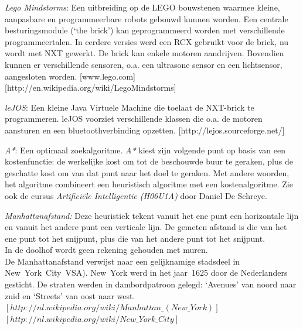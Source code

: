 \documentclass[tt1]{penoverslag}
\begin{document}
\newpage



\begin{thebibliography}{9}
\textit{Lego Mindstorms}:  Een uitbreiding op de LEGO bouwstenen waarmee kleine, aanpasbare en programmeerbare robots gebouwd kunnen worden. Een centrale besturingsmodule (`the brick') kan geprogrammeerd worden met verschillende programmeertalen. In eerdere versies werd een RCX gebruikt voor de brick, nu wordt met NXT gewerkt. De brick kan enkele motoren aandrijven. Bovendien kunnen er verschillende sensoren, o.a. een ultrasone sensor en een lichtsensor, aangesloten worden.  \mbox{[www.lego.com]} \mbox{[http://en.wikipedia.org/wiki/Lego\textendash Mindstorms]}

\textit{leJOS}: Een kleine Java Virtuele Machine die toelaat de NXT-brick te programmeren. leJOS voorziet verschillende klassen die o.a. de motoren aansturen en een bluetoothverbinding opzetten.  \mbox{[http://lejos.sourceforge.net/]}

\textit{A*}: Een optimaal zoekalgoritme. \textit{A*} kiest zijn volgende punt op basis van een kostenfunctie: de werkelijke kost om tot de beschouwde buur te geraken, plus de geschatte kost om van dat punt naar het doel te geraken. Met andere woorden, het algoritme combineert een heuristisch algoritme met een kostenalgoritme. Zie ook de cursus \textit{Artifici\"ele Intelligentie (H06U1A)} door Daniel De Schreye.

\textit{Manhattanafstand:} Deze heuristiek tekent vanuit het ene punt een horizontale lijn en vanuit het andere punt een verticale lijn. De gemeten afstand is die van het ene punt tot het snijpunt, plus die van het andere punt tot het snijpunt.\\
In de doolhof wordt geen rekening gehouden met muren.\\
De Manhattanafstand verwijst naar een gelijknamige stadsdeel in New~York~City~VSA). New~York werd in het jaar~1625 door de Nederlanders gesticht. De straten werden in dambordpatroon gelegd: `Avenues' van noord naar zuid en `Streets' van oost naar west.\\
\mbox{$[http://nl.wikipedia.org/wiki/Manhattan\_(New\_York)]$}\\ \mbox{$[http://nl.wikipedia.org/wiki/New\_York\_City]$}

\end{thebibliography}
\end{document}

